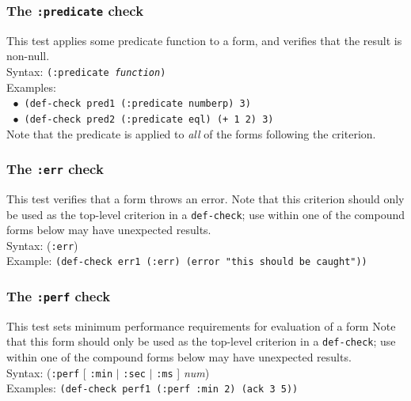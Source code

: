 \documentclass{article}
\begin{document}
\subsubsection{The \texttt{:predicate} check} 
This test applies some predicate function to a form, and verifies that
the result is non-null.
\\ Syntax: \texttt{(:predicate \emph{function})}
\\ Examples:
\\ $~~\bullet$ \texttt{(def-check pred1 (:predicate numberp) 3)}
\\ $~~\bullet$ \texttt{(def-check pred2 (:predicate eql) (+ 1 2) 3)}
\\
Note that the predicate is applied to \emph{all} of the forms
following the criterion.

\subsubsection{The \texttt{:err} check} 
This test verifies that a form throws an error.  Note that this
criterion should only be used as the top-level criterion in a
\texttt{def-check}; use within one of the compound forms below may
have unexpected results.
\\ Syntax: (\texttt{:err})
\\ Example: \texttt{(def-check err1 (:err) (error "this should be caught"))}

\subsubsection{The \texttt{:perf} check}
This test sets minimum performance requirements for evaluation of a
form  Note that this form should only be
used as the top-level criterion in a \texttt{def-check};
use within one of the compound forms below may have
unexpected results.
\\ Syntax: (\texttt{:perf} [ \texttt{:min} $|$ \texttt{:sec} $|$ \texttt{:ms} ] \textit{num})
\\Examples: \texttt{(def-check perf1 (:perf :min 2) (ack 3 5))}

% 
\end{document}

